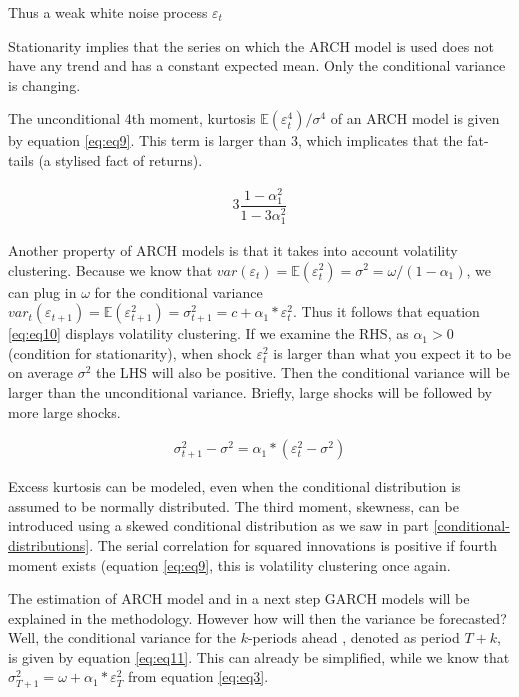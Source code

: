 \documentclass[a4paper, twoside]{templates/ociamthesis}
\begin{document}
Thus a weak white noise process \(\varepsilon_t\)

Stationarity implies that the series on which the ARCH model is used does not have any trend and has a constant expected mean. Only the conditional variance is changing.

The unconditional 4th moment, kurtosis \(\mathbb{E}(\varepsilon_t^4)/\sigma^4\) of an ARCH model is given by equation \eqref{eq:eq9}. This term is larger than 3, which implicates that the fat-tails (a stylised fact of returns).

\begin{align} 
3\dfrac{1-\alpha_1^2}{1-3\alpha_1^2}
 \label{eq:eq9}
\end{align}

Another property of ARCH models is that it takes into account volatility clustering. Because we know that \(var(\varepsilon_t) = \mathbb{E}(\varepsilon_t^2) = \sigma^2 = \omega/(1-\alpha_1)\), we can plug in \(\omega\) for the conditional variance \(var_t(\varepsilon_{t+1}) = \mathbb{E}(\varepsilon_{t+1}^2) = \sigma_{t+1}^2 = c + \alpha_1*\varepsilon_t^2\). Thus it follows that equation \eqref{eq:eq10} displays volatility clustering. If we examine the RHS, as \(\alpha_1>0\) (condition for stationarity), when shock \(\varepsilon_t^2\) is larger than what you expect it to be on average \(\sigma^2\) the LHS will also be positive. Then the conditional variance will be larger than the unconditional variance. Briefly, large shocks will be followed by more large shocks.

\begin{align} 
\sigma_{t+1}^2 - \sigma^2 = \alpha_1*(\varepsilon_t^2 - \sigma^2)
 \label{eq:eq10}
\end{align}

Excess kurtosis can be modeled, even when the conditional distribution is assumed to be normally distributed. The third moment, skewness, can be introduced using a skewed conditional distribution as we saw in part \ref{conditional-distributions}. The serial correlation for squared innovations is positive if fourth moment exists (equation \eqref{eq:eq9}, this is volatility clustering once again.

The estimation of ARCH model and in a next step GARCH models will be explained in the methodology. However how will then the variance be forecasted? Well, the conditional variance for the \(k\)-periods ahead , denoted as period \(T+k\), is given by equation \eqref{eq:eq11}. This can already be simplified, while we know that \(\sigma_{T+1}^2 = \omega + \alpha_1 * \varepsilon_T^2\) from equation \eqref{eq:eq3}.
\end{document}

